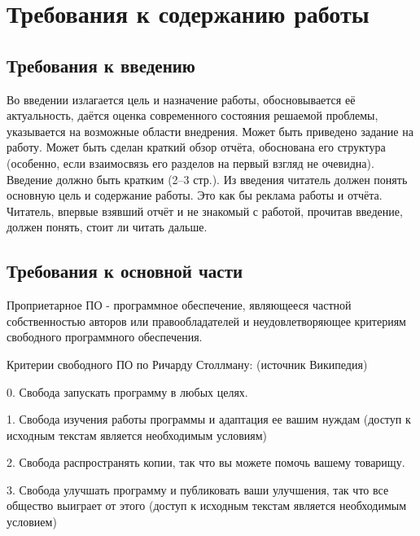 \documentclass[utf8,14pt, coursreport]{G7-32}
\begin{document}



\chapter{Требования к содержанию работы}

\section{Требования к введению}

Во введении излагается цель и назначение работы, обосновывается её актуальность, даётся оценка современного состояния решаемой проблемы, указывается на возможные области внедрения. Может быть приведено задание на работу. Может быть сделан краткий обзор отчёта, обоснована его структура (особенно, если взаимосвязь его разделов на первый взгляд не очевидна). Введение должно быть кратким (2--3 стр.). Из введения читатель должен понять основную цель и содержание работы. Это как бы реклама работы и отчёта. Читатель, впервые взявший отчёт и не знакомый с работой, прочитав введение, должен понять, стоит ли читать дальше.

\section{Требования к основной части}

Проприетарное ПО - программное обеспечение, являющееся частной собственностью авторов или правообладателей и неудовлетворяющее критериям свободного программного обеспечения.

Критерии свободного ПО по Ричарду Столлману: (источник Википедия)

0. Свобода запускать программу в любых целях.

1. Свобода изучения работы программы и адаптация ее вашим нуждам (доступ к исходным текстам является необходимым условиям)

2. Свобода распространять копии, так что вы можете помочь вашему товарищу.

3. Свобода улучшать программу и публиковать ваши улучшения, так что все общество выиграет от этого (доступ к исходным текстам является необходимым условием)
\end{document}
